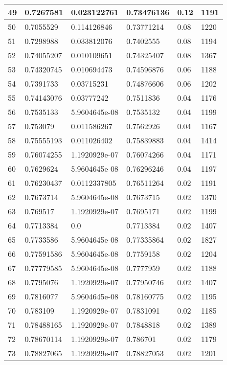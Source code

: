 \begin{longtable}{|l|l|l|l|l|l|}
49 & 0.7267581 & 0.023122761 & 0.73476136 & 0.12 & 1191 \\ \hline 
50 & 0.7055529 & 0.114126846 & 0.73771214 & 0.08 & 1220 \\ \hline 
51 & 0.7298988 & 0.033812076 & 0.7402555 & 0.08 & 1194 \\ \hline 
52 & 0.74055207 & 0.010109651 & 0.74325407 & 0.08 & 1367 \\ \hline 
53 & 0.74320745 & 0.010694473 & 0.74596876 & 0.06 & 1188 \\ \hline 
54 & 0.7391733 & 0.03715231 & 0.74876606 & 0.06 & 1202 \\ \hline 
55 & 0.74143076 & 0.03777242 & 0.7511836 & 0.04 & 1176 \\ \hline 
56 & 0.7535133 & 5.9604645e-08 & 0.7535132 & 0.04 & 1199 \\ \hline 
57 & 0.753079 & 0.011586267 & 0.7562926 & 0.04 & 1167 \\ \hline 
58 & 0.75555193 & 0.011026402 & 0.75839883 & 0.04 & 1414 \\ \hline 
59 & 0.76074255 & 1.1920929e-07 & 0.76074266 & 0.04 & 1171 \\ \hline 
60 & 0.7629624 & 5.9604645e-08 & 0.76296246 & 0.04 & 1197 \\ \hline 
61 & 0.76230437 & 0.0112337805 & 0.76511264 & 0.02 & 1191 \\ \hline 
62 & 0.7673714 & 5.9604645e-08 & 0.7673715 & 0.02 & 1370 \\ \hline 
63 & 0.769517 & 1.1920929e-07 & 0.7695171 & 0.02 & 1199 \\ \hline 
64 & 0.7713384 & 0.0 & 0.7713384 & 0.02 & 1407 \\ \hline 
65 & 0.7733586 & 5.9604645e-08 & 0.77335864 & 0.02 & 1827 \\ \hline 
66 & 0.77591586 & 5.9604645e-08 & 0.7759158 & 0.02 & 1204 \\ \hline 
67 & 0.77779585 & 5.9604645e-08 & 0.7777959 & 0.02 & 1188 \\ \hline 
68 & 0.7795076 & 1.1920929e-07 & 0.77950746 & 0.02 & 1407 \\ \hline 
69 & 0.7816077 & 5.9604645e-08 & 0.78160775 & 0.02 & 1195 \\ \hline 
70 & 0.783109 & 1.1920929e-07 & 0.7831091 & 0.02 & 1185 \\ \hline 
71 & 0.78488165 & 1.1920929e-07 & 0.7848818 & 0.02 & 1389 \\ \hline 
72 & 0.78670114 & 1.1920929e-07 & 0.786701 & 0.02 & 1179 \\ \hline 
73 & 0.78827065 & 1.1920929e-07 & 0.78827053 & 0.02 & 1201 \\ \hline 

\end{longtable}

